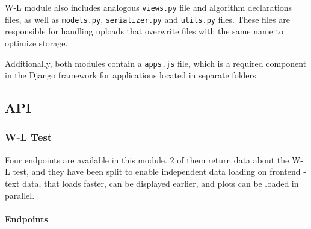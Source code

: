 W-L module also includes analogous \verb|views.py| file and algorithm declarations files, as well as \verb|models.py|, \verb|serializer.py| and \verb|utils.py| files. These files are responsible for handling uploads that overwrite files with the same name to optimize storage.

Additionally, both modules contain a \verb|apps.js| file, which is a required component in the Django framework for applications located in separate folders.

\subsection{API}

\subsubsection{W-L Test}

Four endpoints are available in this module. 2 of them return data about the W-L test, and they have been split to enable independent data loading on frontend - text data, that loads faster, can be displayed earlier, and plots can be loaded in parallel.

\paragraph{Endpoints}

